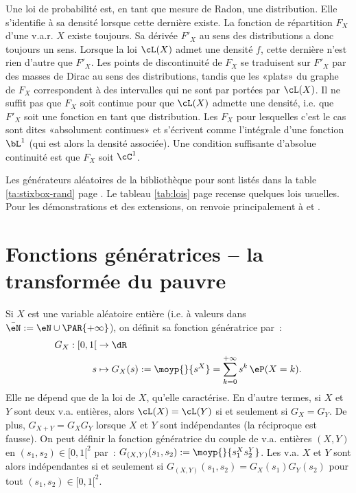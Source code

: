 \begin{rem}
  Une loi de probabilité est, en tant que mesure de Radon, une distribution.
  Elle s'identifie à sa densité lorsque cette dernière existe.  La fonction de
  répartition $F_X$ d'une v.a.r. $X$ existe toujours. Sa dérivée $F'_X$ au
  sens des distributions a donc toujours un sens. Lorsque la loi $\cL(X)$
  admet une densité $f$, cette dernière n'est rien d'autre que $F'_X$.  Les
  points de discontinuité de $F_X$ se traduisent sur $F'_X$ par des masses de
  Dirac au sens des distributions, tandis que les «plats» du graphe de $F_X$
  correspondent à des intervalles qui ne sont par portées par $\cL(X)$. Il ne
  suffit pas que $F_X$ soit continue pour que $\cL(X)$ admette une densité,
  i.e. que $F'_X$ soit une fonction en tant que distribution.  Les $F_X$ pour
  lesquelles c'est le cas sont dites «absolument continues» et s'écrivent
  comme l'intégrale d'une fonction $\bL^1$ (qui est alors la densité
  associée). Une condition suffisante d'absolue continuité est que $F_X$ soit
  $\cC^1$.
\end{rem}

\begin{rem}
  Les générateurs aléatoires de la bibliothèque \SB{} pour \ML{} sont listés
  dans la table \ref{ta:stixbox-rand} page \pageref{ta:stixbox-rand}.  Le
  tableau \ref{tab:lois} page \pageref{tab:lois} recense quelques lois
  usuelles. Pour les démonstrations et des extensions, on renvoie
  principalement à \cite{dacunha-castelle-duflo} et \cite{bouleau}.
\end{rem}

%
\section{Fonctions génératrices -- la transformée du pauvre}
%

Si $X$ est une variable aléatoire entière (i.e. à valeurs dans
$\bar{\eN}:=\eN\cup\PAR{+\infty}$), on définit sa fonction génératrice par~:
\begin{align*}
  G_X:[0,1[ & \to\dR \\
         s & \mapsto G_X(s):=\moyp{}{s^X}=\sum_{k=0}^{+\infty}s^k\,\eP(X=k).
\end{align*}
Elle ne dépend que de la loi de $X$, qu'elle caractérise.  En d'autre termes,
si $X$ et $Y$ sont deux v.a. entières, alors $\cL(X)=\cL(Y)$ si et seulement
si $G_X=G_Y$. De plus, $G_{X+Y}=G_X G_Y$ lorsque $X$ et $Y$ sont indépendantes
(la réciproque est fausse). On peut définir la fonction génératrice du couple
de v.a. entières $(X,Y)$ en $(s_1,s_2)\in[0,1[^2$ par~:
$G_{(X,Y)}(s_1,s_2):=\moyp{}{s_1^Xs_2^Y}$. Les v.a. $X$ et $Y$ sont alors
indépendantes si et seulement si $G_{(X,Y)}(s_1,s_2)=G_X(s_1)G_Y(s_2)$ pour
tout $(s_1,s_2)\in[0,1[^2$.

